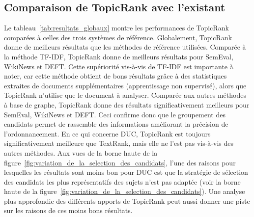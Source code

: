   \subsection{Comparaison de TopicRank avec l'existant}
  \label{subsec:comparaison_de_topicrank_avec_l_existant}
    Le tableau~\ref{tab:resultats_globaux} montre les performances de TopicRank
    comparées à celles des trois systèmes de référence.
    Globalement, TopicRank donne de meilleurs résultats que les méthodes de
    référence utilisées.
    Comparée à la méthode TF-IDF, TopicRank donne de meilleurs résultats pour
    SemEval, WikiNews et DEFT. Cette supériorité vis-à-vis de TF-IDF est
    importante à noter, car cette méthode obtient de bons résultats grâce à des
    statistiques extraites de documents supplémentaires (apprentissage non
    supervisé), alors que TopicRank n'utilise que le document à analyser.
    Comparée aux autres méthodes à base de graphe, TopicRank donne des
    résultats significativement meilleurs pour SemEval, WikiNews et DEFT. Ceci
    confirme donc que le groupement des candidats permet de rassemble des
    informations améliorant la précision de l'ordonnancement. En ce qui concerne
    DUC, TopicRank est toujours significativement meilleure que TextRank, mais
    elle ne l'est pas vis-à-vis des autres méthodes. Aux vues de la borne haute
    de la figure~\ref{fig:variation_de_la_selection_des_candidats}, l'une des
    raisons pour lesquelles les résultats sont moins bon pour DUC est que la
    stratégie de sélection des candidats les plus représentatifs des sujets
    n'est pas adaptée (voir la borne haute de la
    figure~\ref{fig:variation_de_la_selection_des_candidats}). Une analyse plus
    approfondie des différents apports de TopicRank peut aussi donner une piste
    sur les raisons de ces moins bons résultats.
